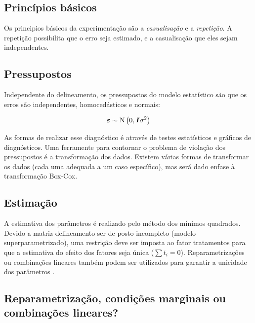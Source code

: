 \documentclass[
]{book}
\begin{document}
\hypertarget{princuxedpios-buxe1sicos}{%
\subsection{Princípios básicos}\label{princuxedpios-buxe1sicos}}

Os principios básicos da experimentação são a \emph{casualisação} e a \emph{repetição}. A repetição possibilita que o erro seja estimado, e a casualisação que eles sejam independentes.

\hypertarget{pressupostos}{%
\subsection{Pressupostos}\label{pressupostos}}

Independente do delineamento, os pressupostos  do modelo estatístico são que os erros são independentes, homocedásticos e normais:

\[
{\boldsymbol{\varepsilon }} \sim {\textrm N}\left( {0,{\boldsymbol{I}}{\sigma ^2}} \right)
\]

As formas de realizar esse diagnóstico é através de testes estatísticos e gráficos de diagnósticos. Uma ferramente para contornar o problema de violação dos pressupostos é a transformação dos dados. Existem várias formas de transformar os dados (cada uma adequada a um caso específico), mas será dado enfase à transformação Box-Cox.

\hypertarget{estimauxe7uxe3o}{%
\subsection{Estimação}\label{estimauxe7uxe3o}}

A estimativa dos parâmetros é realizado pelo método dos minimos quadrados. Devido a matriz delineamento ser de posto incompleto (modelo superparametrizado), uma restrição deve ser imposta ao fator tratamentos para que a estimativa do efeito dos fatores seja única (\(\sum {{t_i}} = 0\)). Reparametrizações ou combinações lineares também podem ser utilizados para garantir a unicidade dos parâmetros \citep{Rencher2008}.

\hypertarget{reparametrizauxe7uxe3o-condiuxe7uxf5es-marginais-ou-combinauxe7uxf5es-lineares}{%
\subsection{Reparametrização, condições marginais ou combinações lineares?}\label{reparametrizauxe7uxe3o-condiuxe7uxf5es-marginais-ou-combinauxe7uxf5es-lineares}}
\end{document}
